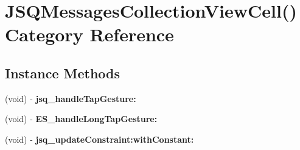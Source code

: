\hypertarget{category_j_s_q_messages_collection_view_cell_07_08}{}\section{J\+S\+Q\+Messages\+Collection\+View\+Cell() Category Reference}
\label{category_j_s_q_messages_collection_view_cell_07_08}
\subsection*{Instance Methods}
\begin{DoxyCompactItemize}
\item 
\hypertarget{category_j_s_q_messages_collection_view_cell_07_08_aa06cde52a23640029d06857d9d198f6d}{}(void) -\/ {\bfseries jsq\+\_\+handle\+Tap\+Gesture\+:}\label{category_j_s_q_messages_collection_view_cell_07_08_aa06cde52a23640029d06857d9d198f6d}

\item 
\hypertarget{category_j_s_q_messages_collection_view_cell_07_08_af3e4902b70eb972ece5df43db4dbbcba}{}(void) -\/ {\bfseries E\+S\+\_\+handle\+Long\+Tap\+Gesture\+:}\label{category_j_s_q_messages_collection_view_cell_07_08_af3e4902b70eb972ece5df43db4dbbcba}

\item 
\hypertarget{category_j_s_q_messages_collection_view_cell_07_08_afafebdee398789283c8a74be1927ed8b}{}(void) -\/ {\bfseries jsq\+\_\+update\+Constraint\+:with\+Constant\+:}\label{category_j_s_q_messages_collection_view_cell_07_08_afafebdee398789283c8a74be1927ed8b}

\end{DoxyCompactItemize}
